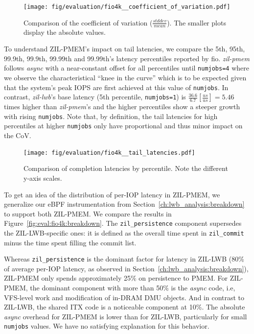\documentclass[12pt,a4paper,twoside]{book}
\begin{document}
\begin{figure}[H]
    \centering
    \texttt{[image: fig/evaluation/fio4k\_\_coefficient\_of\_variation.pdf]}
    \caption{Comparison of the coefficient of variation ($\frac{stddev}{mean}$). The smaller plots display the absolute values.}
    \label{fig:eval:fio4k:cov}
\end{figure}

To understand ZIL-PMEM's impact on tail latencies, we compare the 5th, 95th, 99.9th, 99.9th, 99.99th and 99.99th's latency percentiles reported by fio.
\textit{zil-pmem} follows \textit{async} with a near-constant offset for all percentiles until \lstinline{numjobs=4} where we observe the characteristical ``knee in the curve'' which is to be expected given that the system's peak IOPS are first achieved at this value of \lstinline{numjobs}.
In contrast, \textit{zil-lwb}'s base latency (5th percentile, \lstinline{numjobs=1}) is $\frac{36.6}{6.7} [\frac{us}{us}] = 5.46$ times higher than \textit{zil-pmem}'s and the higher percentiles show a steeper growth with rising \lstinline{numjobs}.
Note that, by definition, the tail latencies for high percentiles at higher \lstinline{numjobs} only have proportional and thus minor impact on the CoV.

\begin{figure}[H]
    \centering
    \texttt{[image: fig/evaluation/fio4k\_\_tail\_latencies.pdf]}
    \caption{Comparison of completion latencies by percentile. Note the different y-axis scales.}
\end{figure}

To get an idea of the distribution of per-IOP latency in ZIL-PMEM, we generalize our eBPF instrumentation from Section~\ref{ch:lwb_analysis:breakdown} to support both ZIL-PMEM.
We compare the results in Figure~\ref{fig:eval:fio4k:breakdown}.
The \lstinline{zil_persistence} component supersedes the ZIL-LWB-specific ones: it is defined as the overall time spent in \lstinline{zil_commit} minus the time spent filling the commit list.

Whereas \lstinline{zil_persistence} is the dominant factor for latency in ZIL-LWB (80\% of average per-IOP latency, as observed in Section~\ref{ch:lwb_analysis:breakdown}), ZIL-PMEM only spends approximately 25\% on persistence to PMEM.
For ZIL-PMEM, the dominant component with more than 50\% is the \textit{async} code, i.e, VFS-level work and modification of in-DRAM DMU objects.
And in contrast to ZIL-LWB, the shared ITX code is a noticeable component at 10\%.
The absolute \textit{async} overhead for ZIL-PMEM is lower than for ZIL-LWB, particularly for small \lstinline{numjobs} values.
We have no satisfying explanation for this behavior.
\end{document}
